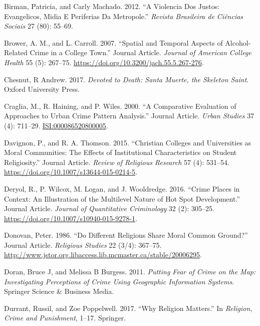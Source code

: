 \documentclass[smallextended]{svjour3}       %
\begin{document}
\leavevmode\hypertarget{ref-Birman2012violencia}{}%
Birman, Patricia, and Carly Machado. 2012. ``A Violencia Dos Justos:
Evangelicos, Midia E Periferias Da Metropole.'' \emph{Revista Brasileira
de Ciências Sociais} 27 (80): 55--69.

\leavevmode\hypertarget{ref-Brower2007spatial}{}%
Brower, A. M., and L. Carroll. 2007. ``Spatial and Temporal Aspects of
Alcohol-Related Crime in a College Town.'' Journal Article.
\emph{Journal of American College Health} 55 (5): 267--75.
\url{https://doi.org/10.3200/jach.55.5.267-276}.

\leavevmode\hypertarget{ref-Chesnut2017devoted}{}%
Chesnut, R Andrew. 2017. \emph{Devoted to Death: Santa Muerte, the
Skeleton Saint}. Oxford University Press.

\leavevmode\hypertarget{ref-Craglia2000comparative}{}%
Craglia, M., R. Haining, and P. Wiles. 2000. ``A Comparative Evaluation
of Approaches to Urban Crime Pattern Analysis.'' Journal Article.
\emph{Urban Studies} 37 (4): 711--29. \url{ISI:000086520800005}.

\leavevmode\hypertarget{ref-Davignon2015christian}{}%
Davignon, P., and R. A. Thomson. 2015. ``Christian Colleges and
Universities as Moral Communities: The Effects of Institutional
Characteristics on Student Religiosity.'' Journal Article. \emph{Review
of Religious Research} 57 (4): 531--54.
\url{https://doi.org/10.1007/s13644-015-0214-5}.

\leavevmode\hypertarget{ref-Deryol2016crime}{}%
Deryol, R., P. Wilcox, M. Logan, and J. Wooldredge. 2016. ``Crime Places
in Context: An Illustration of the Multilevel Nature of Hot Spot
Development.'' Journal Article. \emph{Journal of Quantitative
Criminology} 32 (2): 305--25.
\url{https://doi.org/10.1007/s10940-015-9278-1}.

\leavevmode\hypertarget{ref-Donovan1986different}{}%
Donovan, Peter. 1986. ``Do Different Religions Share Moral Common
Ground?'' Journal Article. \emph{Religious Studies} 22 (3/4): 367--75.
\url{http://www.jstor.org.libaccess.lib.mcmaster.ca/stable/20006295}.

\leavevmode\hypertarget{ref-Doran2011putting}{}%
Doran, Bruce J, and Melissa B Burgess. 2011. \emph{Putting Fear of Crime
on the Map: Investigating Perceptions of Crime Using Geographic
Information Systems}. Springer Science \& Business Media.

\leavevmode\hypertarget{ref-Durrant2017religion}{}%
Durrant, Russil, and Zoe Poppelwell. 2017. ``Why Religion Matters.'' In
\emph{Religion, Crime and Punishment}, 1--17. Springer.
\end{document}
